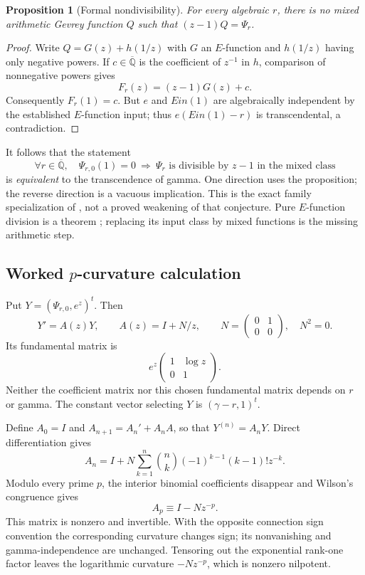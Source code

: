 \documentclass[11pt,a4paper]{article}
\newtheorem{proposition}[theorem]{Proposition}
\theoremstyle{definition}
\theoremstyle{remark}
\theoremstyle{plain}
\numberwithin{equation}{section}
\def\operatorname#1{#1}\def\mathrm#1{#1}}
\begin{document}
\begin{proposition}[Formal nondivisibility]\label{em:mixed-nondivisibility}
For every algebraic $r$, there is no mixed arithmetic Gevrey function
$Q$ such that $(z-1)Q=\Psi_r$.
\end{proposition}
\begin{proof}
Write $Q=G(z)+h(1/z)$ with $G$ an $E$-function and $h(1/z)$ having
only negative powers. If $c\in\overline{\mathbb Q}$ is the coefficient
of $z^{-1}$ in $h$, comparison of nonnegative powers gives
\[
 F_r(z)=(z-1)G(z)+c.
\]
Consequently $F_r(1)=c$. But $e$ and $\operatorname{Ein}(1)$ are
algebraically independent by the established $E$-function input;
thus $e(\operatorname{Ein}(1)-r)$ is transcendental, a contradiction.
\end{proof}

It follows that the statement
\[
 \forall r\in\overline{\mathbb Q},\quad
 \Psi_{r,0}(1)=0\ \Longrightarrow\
 \Psi_r\text{ is divisible by }z-1\text{ in the mixed class}
\]
is \emph{equivalent} to the transcendence of gamma. One direction
uses the proposition; the reverse direction is a vacuous implication.
This is the exact family specialization of
\cite[Conjecture~3]{FRmixed}, not a proved weakening of that
conjecture. Pure $E$-function division is a theorem
\cite[Proposition~4.1]{Beukers}; replacing its input class by mixed
functions is the missing arithmetic step.

\subsection{Worked \texorpdfstring{$p$}{p}-curvature calculation}

Put $Y=(\Psi_{r,0},e^z)^t$. Then
\[
 Y'=A(z)Y,\qquad A(z)=I+N/z,\qquad
 N=\begin{pmatrix}0&1\\0&0\end{pmatrix},\quad N^2=0.
\]
Its fundamental matrix is
\[
 e^z\begin{pmatrix}1&\log z\\0&1\end{pmatrix}.
\]
Neither the coefficient matrix nor this chosen fundamental matrix
depends on $r$ or gamma. The constant vector selecting $Y$ is
$(\gamma-r,1)^t$.

Define $A_0=I$ and $A_{n+1}=A_n'+A_nA$, so that $Y^{(n)}=A_nY$.
Direct differentiation gives
\[
 A_n=I+N\sum_{k=1}^n\binom nk(-1)^{k-1}(k-1)!z^{-k}.
\]
Modulo every prime $p$, the interior binomial coefficients disappear
and Wilson's congruence gives
\[
 A_p\equiv I-Nz^{-p}.
\]
This matrix is nonzero and invertible. With the opposite connection
sign convention the corresponding curvature changes sign; its
nonvanishing and gamma-independence are unchanged. Tensoring out the
exponential rank-one factor leaves the logarithmic curvature
$-Nz^{-p}$, which is nonzero nilpotent.
\end{document}
